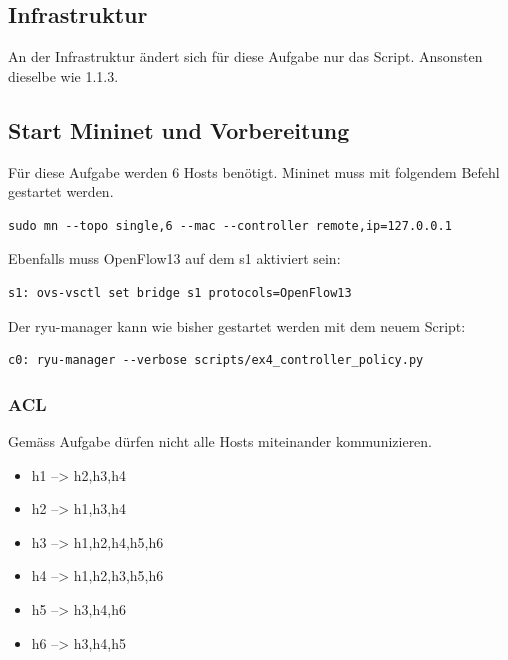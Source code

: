 \documentclass[a4,12pt]{scrartcl}
\begin{document}
\subsection{Infrastruktur}
An der Infrastruktur ändert sich für diese Aufgabe nur das Script. Ansonsten dieselbe wie 1.1.3.

\subsection{Start Mininet und Vorbereitung}
Für diese Aufgabe werden 6 Hosts benötigt. Mininet muss mit folgendem Befehl gestartet werden.
\begin{lstlisting}
sudo mn --topo single,6 --mac --controller remote,ip=127.0.0.1 
\end{lstlisting}
Ebenfalls muss OpenFlow13 auf dem s1 aktiviert sein: 
\begin{lstlisting}
s1: ovs-vsctl set bridge s1 protocols=OpenFlow13
\end{lstlisting}
Der ryu-manager kann wie bisher gestartet werden mit dem neuem Script: 
\begin{lstlisting}
c0: ryu-manager --verbose scripts/ex4_controller_policy.py
\end{lstlisting}

\subsubsection{ACL}
Gemäss Aufgabe dürfen nicht alle Hosts miteinander kommunizieren. 
\begin{itemize}
\item h1 --> h2,h3,h4
\item h2 --> h1,h3,h4
\item h3 --> h1,h2,h4,h5,h6
\item h4 --> h1,h2,h3,h5,h6
\item h5 --> h3,h4,h6
\item h6 --> h3,h4,h5
\end{itemize}
\end{document}
